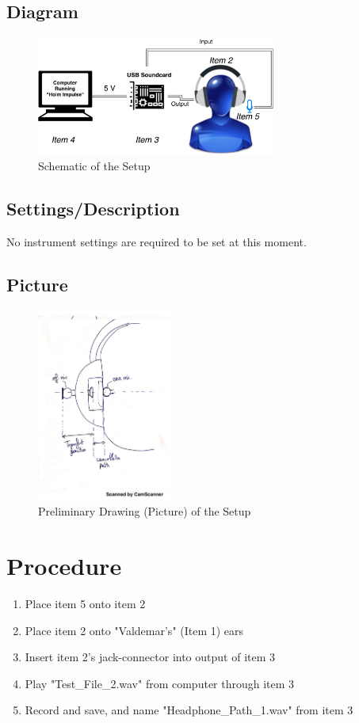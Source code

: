 \documentclass[12pt,a4paper,openright]{article}
\begin{document}
\subsection{Diagram}
\begin{figure}[H]
	\centering
	\includegraphics[width=0.7\textwidth]{Schem2.pdf}
	\caption{Schematic of the Setup}
	\label{Schematic}
\end{figure}

\subsection{Settings/Description}
No instrument settings are required to be set at this moment.

\subsection{Picture}
\begin{figure}[H]
	\centering
	\includegraphics[width=0.4\textwidth]{picture.png}
	\caption{Preliminary Drawing (Picture) of the Setup}
	\label{PictureDrawing}
\end{figure}

\section{Procedure}
\begin{enumerate}
	\item Place item 5 onto item 2
	\item Place item 2 onto "Valdemar's" (Item 1) ears
	\item Insert item 2's jack-connector into output of item 3
	\item Play "Test\_File\_2.wav" from computer through item 3
	\item Record and save, and name "Headphone\_Path\_1.wav" from item 3
\end{enumerate}
\end{document}
